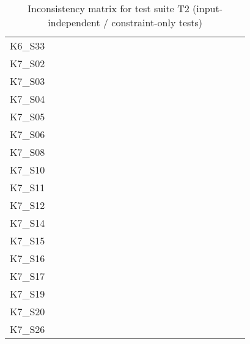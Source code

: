 \begin{table}
\begin{tabular}{l|rrrrrrrrrrrrrrrrrrrr}
        K6\_S33 & \y & \y & \y & \y & \y & \y & \y & \y & \y & \y & \y & \x & \y & \y & \x & \y & \y & \y & \y & \y \\
        K7\_S02 & \y & \y & \y & \y & \y & \y & \y & \y & \y & \y & \y & \y & \y & \y & \y & \y & \y & \y & \y & \y \\
        K7\_S03 & \y & \y & \y & \y & \y & \y & \y & \y & \y & \y & \y & \y & \y & \y & \y & \y & \y & \y & \y & \y \\
        K7\_S04 & \y & \y & \y & \y & \y & \y & \y & \y & \y & \y & \y & \y & \y & \y & \y & \y & \y & \y & \y & \y \\
        K7\_S05 & \y & \y & \y & \y & \y & \y & \y & \y & \y & \y & \y & \y & \y & \y & \y & \y & \y & \y & \y & \y \\
        K7\_S06 & \y & \y & \y & \y & \y & \y & \y & \y & \y & \y & \y & \y & \y & \y & \y & \y & \y & \y & \y & \y \\
        K7\_S08 & \y & \y & \y & \y & \y & \y & \y & \y & \y & \y & \y & \x & \y & \y & \y & \y & \y & \y & \y & \y \\
        K7\_S10 & \y & \y & \y & \y & \y & \y & \y & \y & \y & \y & \y & \y & \y & \y & \y & \y & \y & \y & \y & \y \\
        K7\_S11 & \y & \y & \y & \y & \y & \y & \y & \y & \y & \y & \y & \y & \y & \y & \y & \y & \y & \y & \y & \y \\
        K7\_S12 & \y & \y & \y & \y & \y & \y & \y & \y & \y & \y & \y & \y & \y & \y & \y & \y & \y & \y & \y & \y \\
        K7\_S14 & \y & \y & \y & \y & \y & \y & \y & \y & \y & \y & \y & \y & \y & \y & \y & \y & \y & \y & \y & \y \\
        K7\_S15 & \y & \y & \y & \y & \y & \y & \y & \y & \y & \y & \y & \y & \y & \y & \y & \y & \y & \y & \y & \y \\
        K7\_S16 & \y & \x & \y & \y & \y & \y & \y & \y & \y & \y & \y & \y & \y & \y & \y & \y & \y & \y & \y & \y \\
        K7\_S17 & \y & \y & \y & \y & \x & \y & \y & \y & \y & \y & \y & \y & \y & \y & \y & \y & \x & \y & \y & \y \\
        K7\_S19 & \y & \y & \y & \y & \y & \y & \y & \y & \y & \y & \y & \y & \y & \y & \y & \y & \y & \y & \y & \y \\
        K7\_S20 & \y & \y & \y & \y & \y & \y & \y & \y & \y & \y & \y & \y & \y & \y & \x & \y & \y & \y & \y & \y \\
        K7\_S26 & \y & \y & \y & \y & \y & \y & \y & \y & \y & \y & \y & \y & \y & \y & \y & \y & \y & \y & \y & \y \\
        \bottomrule
    \end{tabular}
    \caption{Inconsistency matrix for test suite T2 (input-independent / constraint-only tests)}
    \label{tab:inconsistencies_matrix_constraint}
    \setlength{\tabcolsep}{\defaulttabcolsep}
\end{table}

